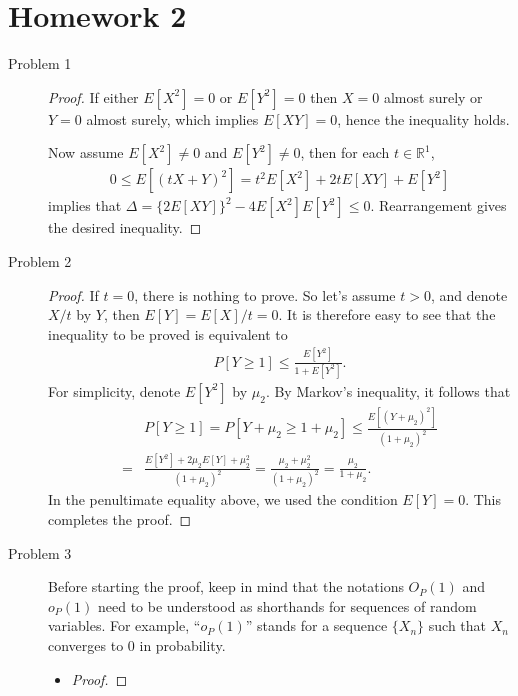 \documentclass{article}
\newcommand{\real}{\mathbb{R}}
\theoremstyle{definition}
\theoremstyle{plain}
\theoremstyle{remark}
\begin{document}
\section*{Homework 2}
\begin{description}
\item[Problem 1]
\begin{proof} 
If either $E[X^2] = 0$ or $E[Y^2] = 0$ then $X = 0$ almost surely or $Y = 0$ almost 
surely, which implies $E[XY] = 0$, hence the inequality holds.

Now assume $E[X^2] \neq 0$ and $E[Y^2] \neq 0$, then for each $t \in \real^1$, 
\begin{align*}
   0 \leq E[(tX + Y)^2] = t^2E[X^2] + 2tE[XY] + E[Y^2]
\end{align*}
implies that $\Delta = \{2E[XY]\}^2 - 4E[X^2]E[Y^2] \leq 0$. Rearrangement gives the
desired inequality.
\end{proof}

\item[Problem 2]
\begin{proof}
If $t = 0$, there is nothing to prove. So let's assume $t > 0$, and denote $X/t$ by 
$Y$, then $E[Y] = E[X]/t = 0$. It is therefore easy to see that the inequality to be
proved is equivalent to 
\begin{align*}
    P[Y \geq 1] \leq \frac{E[Y^2]}{1 + E[Y^2]}.
\end{align*}
For simplicity, denote $E[Y^2]$ by $\mu_2$. By Markov's inequality, it follows that
\begin{align*}
    & P[Y \geq 1] = P[Y + \mu_2 \geq 1 + \mu_2] \leq \frac{E[(Y + \mu_2)^2]}{(1 + \mu_2)^2} \\
    = & \frac{E[Y^2] + 2\mu_2E[Y] + \mu_2^2}{(1 + \mu_2)^2}
    = \frac{\mu_2 + \mu_2^2}{(1 + \mu_2)^2} = \frac{\mu_2}{1 + \mu_2}.
\end{align*}
In the penultimate equality above, we used the condition $E[Y] = 0$. This completes
the proof.
\end{proof}

\item[Problem 3]
Before starting the proof, keep in mind that the notations $O_P(1)$ and $o_P(1)$ 
need to be understood as shorthands for sequences of random variables. For example,
``$o_P(1)$'' stands for a sequence $\{X_n\}$ such that $X_n$ converges to $0$ 
in probability.

\begin{itemize}
\item 
\begin{proof}


\end{proof}
\end{itemize}
\end{description}
\end{document}
